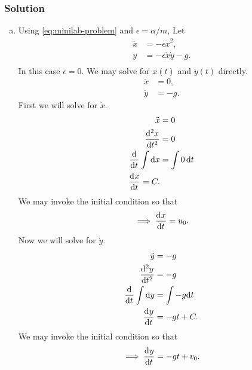 \documentclass[12pt]{article}
\begin{document}
\subsubsection*{Solution}
\begin{enumerate}[(a)]
\item Using \cref{eq:minilab-problem} and $\epsilon=\alpha/m$, Let
  \begin{equation}
    \label{eq:minilab-1-let}
    \begin{aligned}
      \ddot{x} &= -\epsilon\dot{x}^2, \\
      \ddot{y} &= -\epsilon\dot{x}\dot{y}-g. \\
    \end{aligned}
  \end{equation}
  In this case $\epsilon = 0$. We may solve for $x(t)$ and $y(t)$ directly.
  \begin{equation*}
    \begin{aligned}
      \ddot{x} &= 0, \\
      \ddot{y} &= -g.
    \end{aligned}
  \end{equation*}
  First we will solve for $\dot{x}$.
  \begin{equation*}
    \begin{aligned}
      \ddot{x} &= 0 \\
      \od[2]{x}{t} &= 0 \\
      \od{}{t}\int\dd{x} &= \int 0\, \dd{t} \\
      \od{x}{t} = C. \\
    \end{aligned}
  \end{equation*}
  We may invoke the initial condition so that
  \begin{equation*}
    \implies\od{x}{t} = u_0.
  \end{equation*}
  Now we will solve for $\dot{y}$.
  \begin{equation*}
    \begin{aligned}
      \ddot{y} &= -g \\
      \od[2]{y}{t} &= -g \\
      \od{}{t}\int\dd{y} &= \int-g\dd{t} \\
      \od{y}{t} &= -gt + C. \\
    \end{aligned}
  \end{equation*}
  We may invoke the initial condition so that
  \begin{equation*}
    \implies \od{y}{t} = -gt + v_0.

\end{equation*}
\end{enumerate}
\end{document}
